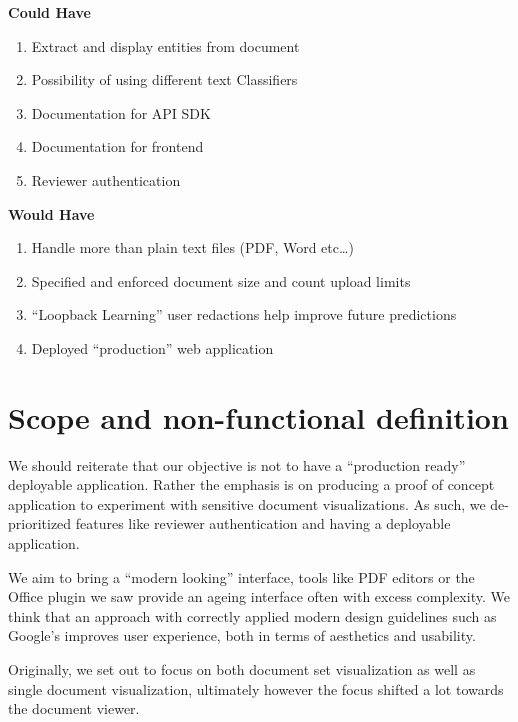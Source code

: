 \documentclass[\version]{l4proj}
\begin{document}
\begin{minipage}[t]{.5\linewidth}
    \centerline{\textbf{Could Have}}
    \begin{enumerate}[label=\textbf{C\arabic*}]
        \item Extract and display entities from document
        \item Possibility of using different text Classifiers
        \item Documentation for API SDK
        \item Documentation for frontend
        \item Reviewer authentication
    \end{enumerate}
\end{minipage}
\hfill
\noindent
\begin{minipage}[t]{.5\linewidth}
    \centerline{\textbf{Would Have}}
    \begin{enumerate}[label=\textbf{W\arabic*}]
        \item Handle more than plain text files (PDF, Word etc…)
        \item Specified and enforced document size and count upload limits
        \item ``Loopback Learning'' user redactions help improve future predictions
        \item Deployed ``production'' web application
    \end{enumerate}
\end{minipage}

\section{Scope and non-functional definition}

We should reiterate that our objective is not to have a ``production ready'' deployable application.
Rather the emphasis is on producing a proof of concept application to experiment with sensitive document visualizations.
As such, we de-prioritized features like reviewer authentication and having a deployable application.

We aim to bring a ``modern looking'' interface, tools like PDF editors or the Office plugin we saw provide an ageing interface often with excess complexity.
We think that an approach with correctly applied modern design guidelines such as Google's \textcite{MaterialDesign} improves user experience, both in terms of aesthetics and usability.

Originally, we set out to focus on both document set visualization as well as single document visualization, ultimately however the focus shifted a lot towards the document viewer.
\end{document}
